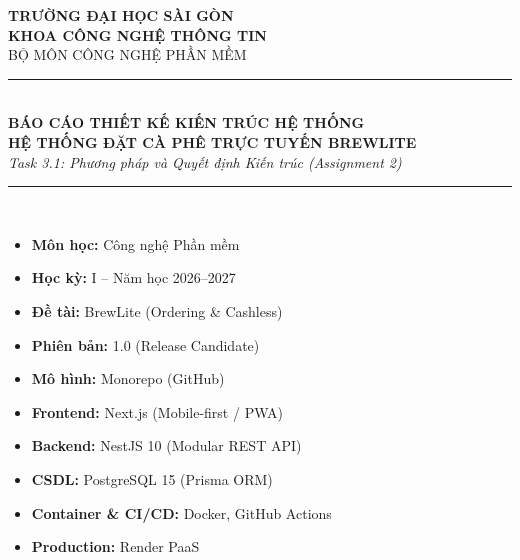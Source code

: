 \documentclass[11pt, a4paper]{article}
\begin{document}
\begin{center}
	{\large\bfseries\color{primary} TRƯỜNG ĐẠI HỌC SÀI GÒN}\\[2pt]
	{\bfseries\color{secondary} KHOA CÔNG NGHỆ THÔNG TIN}\\[2pt]
	{\small\color{darktext} BỘ MÔN CÔNG NGHỆ PHẦN MỀM}\\[10pt]
	\rule{0.6\textwidth}{1.2pt}\\[14pt]

	{\LARGE\bfseries\color{primary} BÁO CÁO THIẾT KẾ KIẾN TRÚC HỆ THỐNG}\\[6pt]
	{\Large\bfseries\color{accent} HỆ THỐNG ĐẶT CÀ PHÊ TRỰC TUYẾN BREWLITE}\\[6pt]
	{\itshape\color{darktext} Task 3.1: Phương pháp và Quyết định Kiến trúc (Assignment 2)}\\[10pt]
	\rule{0.6\textwidth}{1.2pt}\\[15pt]
\end{center}

\begin{minipage}[t]{0.48\textwidth}
	\begin{tcolorbox}[colback=lightbg, colframe=bordercolor, arc=3pt, title={\bfseries THÔNG TIN DỰ ÁN}, coltitle=secondary]
		\small
		\begin{itemize}
			\item \textbf{Môn học:} Công nghệ Phần mềm
			\item \textbf{Học kỳ:} I -- Năm học 2026--2027
			\item \textbf{Đề tài:} BrewLite (Ordering \& Cashless)
			\item \textbf{Phiên bản:} 1.0 (Release Candidate)
			\item \textbf{Mô hình:} Monorepo (GitHub)
		\end{itemize}
	\end{tcolorbox}
\end{minipage}
\hfill
\begin{minipage}[t]{0.48\textwidth}
	\begin{tcolorbox}[colback=lightbg, colframe=bordercolor, arc=3pt, title={\bfseries CÔNG NGHỆ BẮT BUỘC}, coltitle=secondary]
		\small
		\begin{itemize}
			\item \textbf{Frontend:} Next.js (Mobile-first / PWA)
			\item \textbf{Backend:} NestJS 10 (Modular REST API)
			\item \textbf{CSDL:} PostgreSQL 15 (Prisma ORM)
			\item \textbf{Container \& CI/CD:} Docker, GitHub Actions
			\item \textbf{Production:} Render PaaS
		\end{itemize}
	\end{tcolorbox}
\end{minipage}
\end{document}
